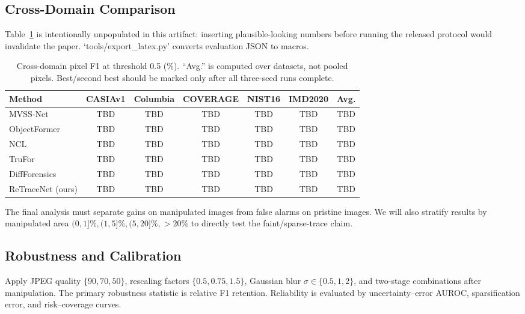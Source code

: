 \documentclass[journal]{IEEEtran}
\newcommand{\TBD}{\textcolor{red!70!black}{TBD}}
\newcommand{\method}{ReTraceNet}
\begin{document}
\subsection{Cross-Domain Comparison}
Table~\ref{tab:main} is intentionally unpopulated in this artifact: inserting
plausible-looking numbers before running the released protocol would invalidate
the paper.  `tools/export_latex.py' converts evaluation JSON to macros.

\begin{table}[t]
\centering
\caption{Cross-domain pixel F1 at threshold 0.5 (\%). ``Avg.'' is computed over
datasets, not pooled pixels. Best/second best should be marked only after all
three-seed runs complete.}
\label{tab:main}
\setlength{\tabcolsep}{5pt}
\begin{tabular}{lcccccc}
\toprule
Method & CASIAv1 & Columbia & COVERAGE & NIST16 & IMD2020 & Avg.\\
\midrule
MVSS-Net \cite{chen2021mvss} & \TBD & \TBD & \TBD & \TBD & \TBD & \TBD\\
ObjectFormer \cite{wang2022objectformer} & \TBD & \TBD & \TBD & \TBD & \TBD & \TBD\\
NCL \cite{zhou2023ncl} & \TBD & \TBD & \TBD & \TBD & \TBD & \TBD\\
TruFor \cite{guillaro2023trufor} & \TBD & \TBD & \TBD & \TBD & \TBD & \TBD\\
DiffForensics \cite{yu2024diffforensics} & \TBD & \TBD & \TBD & \TBD & \TBD & \TBD\\
\method{} (ours) & \TBD & \TBD & \TBD & \TBD & \TBD & \TBD\\
\bottomrule
\end{tabular}
\end{table}

The final analysis must separate gains on manipulated images from false alarms on
pristine images.  We will also stratify results by manipulated area
$(0,1]\%,(1,5]\%,(5,20]\%,>20\%$ to directly test the faint/sparse-trace claim.

\subsection{Robustness and Calibration}
Apply JPEG quality $\{90,70,50\}$, rescaling factors $\{0.5,0.75,1.5\}$, Gaussian
blur $\sigma\in\{0.5,1,2\}$, and two-stage combinations after manipulation.  The
primary robustness statistic is relative F1 retention.  Reliability is evaluated
by uncertainty--error AUROC, sparsification error, and risk--coverage curves.
\end{document}

